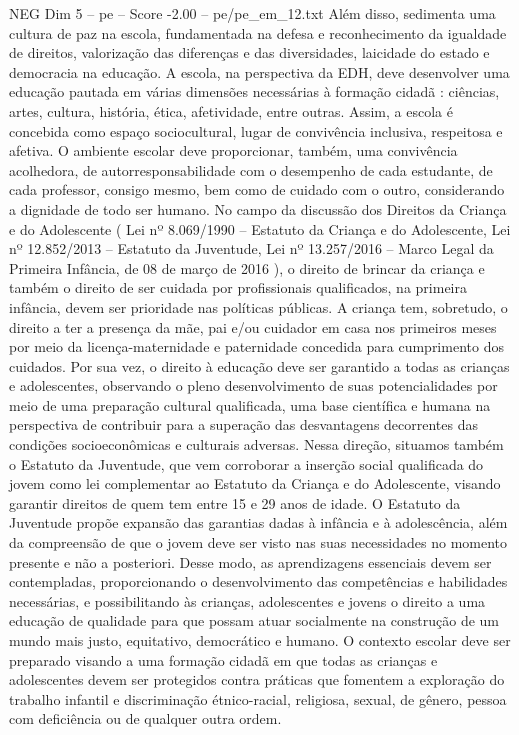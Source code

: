 \begin{textsample}{NEG Dim 5 – pe – Score -2.00 – pe/pe\_em\_12.txt}
Além disso, sedimenta uma cultura de paz na escola, fundamentada na defesa e reconhecimento da igualdade de direitos, valorização das diferenças e das diversidades, laicidade do estado e democracia na educação.
A escola, na perspectiva da EDH, deve desenvolver uma educação pautada em várias dimensões necessárias à formação cidadã : ciências, artes, cultura, história, ética, afetividade, entre outras.
Assim, a escola é concebida como espaço sociocultural, lugar de convivência inclusiva, respeitosa e afetiva.
O ambiente escolar deve proporcionar, também, uma convivência acolhedora, de autorresponsabilidade com o desempenho de cada estudante, de cada professor, consigo mesmo, bem como de cuidado com o outro, considerando a dignidade de todo ser humano.
No campo da discussão dos Direitos da Criança e do Adolescente ( Lei nº 8.069/1990 – Estatuto da Criança e do Adolescente, Lei nº 12.852/2013 – Estatuto da Juventude, Lei nº 13.257/2016 – Marco Legal da Primeira Infância, de 08 de março de 2016 ), o direito de brincar da criança e também o direito de ser cuidada por profissionais qualificados, na primeira infância, devem ser prioridade nas políticas públicas.
A criança tem, sobretudo, o direito a ter a presença da mãe, pai e/ou cuidador em casa nos primeiros meses por meio da licença-maternidade e paternidade concedida para cumprimento dos cuidados.
Por sua vez, o direito à educação deve ser garantido a todas as crianças e adolescentes, observando o pleno desenvolvimento de suas potencialidades por meio de uma preparação cultural qualificada, uma base científica e humana na perspectiva de contribuir para a superação das desvantagens decorrentes das condições socioeconômicas e culturais adversas.
Nessa direção, situamos também o Estatuto da Juventude, que vem corroborar a inserção social qualificada do jovem como lei complementar ao Estatuto da Criança e do Adolescente, visando garantir direitos de quem tem entre 15 e 29 anos de idade.
O Estatuto da Juventude propõe expansão das garantias dadas à infância e à adolescência, além da compreensão de que o jovem deve ser visto nas suas necessidades no momento presente e não a posteriori.
Desse modo, as aprendizagens essenciais devem ser contempladas, proporcionando o desenvolvimento das competências e habilidades necessárias, e possibilitando às crianças, adolescentes e jovens o direito a uma educação de qualidade para que possam atuar socialmente na construção de um mundo mais justo, equitativo, democrático e humano.
O contexto escolar deve ser preparado visando a uma formação cidadã em que todas as crianças e adolescentes devem ser protegidos contra práticas que fomentem a exploração do trabalho infantil e discriminação étnico-racial, religiosa, sexual, de gênero, pessoa com deficiência ou de qualquer outra ordem.

\end{textsample}
